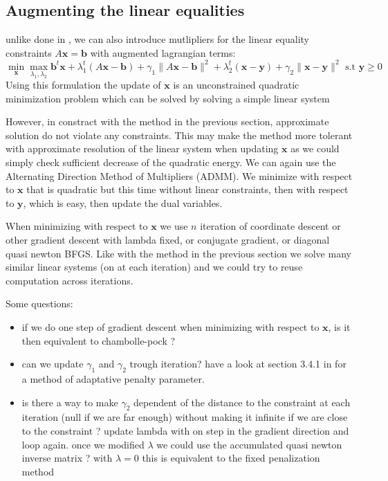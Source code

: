 \documentclass[11pt]{article}
\begin{document}
 
\subsection{Augmenting the linear equalities}
unlike done in  \cite{Boyd2010}, we can also introduce mutlipliers for the linear equality constraints $A\mathbf{x}=\mathbf{b}$ with augmented lagrangian terms:
\begin{equation}
\mathop{min}_ \mathbf{x} \mathop{max}_{\lambda_1,\lambda_2} \mathbf{b}^t\mathbf{x} +\lambda_1^t(A\mathbf{x}-\mathbf{b})+ \gamma_1\|A\mathbf{x}-\mathbf{b}\|^2+\lambda_2^t (\mathbf{x}- \mathbf{y})+\gamma_2\|\mathbf{x}-\mathbf{y}\|^2 \text{ s.t }  \mathbf{y}\geq 0
\end{equation}
Using this formulation  the update of $\mathbf{x}$ is an unconstrained quadratic minimization problem which can be solved by solving a simple linear system

However, in constract with the method in the previous section, approximate solution do not violate any constraints. This may make the method more tolerant with approximate resolution of the linear system when updating $\mathbf{x}$ as we could simply check sufficient decrease of the quadratic  energy. We can again use the Alternating Direction Method of Multipliers (ADMM).
We minimize with respect to $\mathbf{x}$ that is quadratic but this time without linear constraints, then with respect to $\mathbf{y}$, which is easy, then update the dual variables.



When minimizing with respect to $\mathbf{x}$ we use $n$ iteration of coordinate descent or other gradient descent with lambda fixed, or conjugate gradient, or diagonal quasi newton BFGS. 
Like with the method in the previous section we solve many similar linear systems (on at each iteration) and we could try to reuse computation across iterations.


Some questions:
\begin{itemize}
\item if we do one step of gradient descent when minimizing with respect to $\mathbf{x}$, is it then equivalent to chambolle-pock  ?
 \item can we update $\gamma_1$ and $\gamma_2$ trough iteration?
have a look at section 3.4.1 in  \cite{Boyd2010} for a method of adaptative penalty parameter.
 \item is there a way to make $\gamma_2$ dependent of the distance to the constraint at each iteration (null if we are far enough) without making it infinite if we are close to the constraint ?  update lambda with on step in the gradient direction and loop again. once we modified $\lambda$ we could use the accumulated quasi newton inverse matrix ? with $\lambda=0$ this is equivalent to the fixed penalization method 
\end{itemize}
\end{document}

